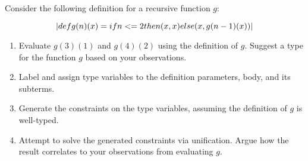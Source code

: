 

\pagebreak
\begin{exercise}{}

  Consider the following definition for a recursive function \(g\):

  \begin{equation*}
    \lstinline|def g(n)(x)  = if n <=  2 then (x, x)  else (x, g(n - 1)(x))|
  \end{equation*}

  \begin{enumerate}
    \item Evaluate \(g(3)(1)\) and \(g(4)(2)\) using the definition of \(g\).
      Suggest a type for the function \(g\) based on your observations.
    \item Label and assign type variables to the definition parameters, body,
      and its subterms.
    \item Generate the constraints on the type variables, assuming the
      definition of \(g\) is well-typed.
    \item Attempt to solve the generated constraints via unification. Argue how
    the result correlates to your observations from evaluating \(g\).
  \end{enumerate}
  

\end{exercise}
